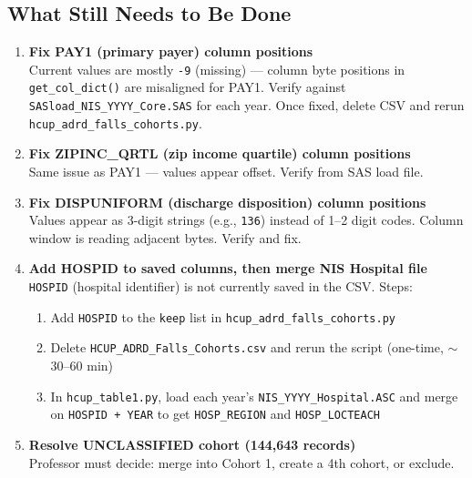 \documentclass[11pt,letterpaper]{article}
\begin{document}
\subsection{What Still Needs to Be Done}

\begin{tcolorbox}[colback=warnred!8, colframe=warnred,
  title=\textbf{Pending Tasks — Project 2}]
\begin{enumerate}[itemsep=6pt]
  \item \textbf{Fix PAY1 (primary payer) column positions} \\
        Current values are mostly \texttt{-9} (missing) — column byte positions in
        \texttt{get\_col\_dict()} are misaligned for PAY1. Verify against
        \texttt{SASload\_NIS\_YYYY\_Core.SAS} for each year. Once fixed, delete CSV
        and rerun \texttt{hcup\_adrd\_falls\_cohorts.py}.

  \item \textbf{Fix ZIPINC\_QRTL (zip income quartile) column positions} \\
        Same issue as PAY1 — values appear offset. Verify from SAS load file.

  \item \textbf{Fix DISPUNIFORM (discharge disposition) column positions} \\
        Values appear as 3-digit strings (e.g., \texttt{136}) instead of 1–2 digit
        codes. Column window is reading adjacent bytes. Verify and fix.

  \item \textbf{Add HOSPID to saved columns, then merge NIS Hospital file} \\
        \texttt{HOSPID} (hospital identifier) is not currently saved in the CSV.
        Steps:
        \begin{enumerate}
          \item Add \texttt{HOSPID} to the \texttt{keep} list in
                \texttt{hcup\_adrd\_falls\_cohorts.py}
          \item Delete \texttt{HCUP\_ADRD\_Falls\_Cohorts.csv} and rerun the script
                (one-time, $\sim$30–60 min)
          \item In \texttt{hcup\_table1.py}, load each year's
                \texttt{NIS\_YYYY\_Hospital.ASC} and merge on \texttt{HOSPID + YEAR}
                to get \texttt{HOSP\_REGION} and \texttt{HOSP\_LOCTEACH}
        \end{enumerate}

  \item \textbf{Resolve UNCLASSIFIED cohort (144,643 records)} \\
        Professor must decide: merge into Cohort 1, create a 4th cohort, or exclude.


\end{enumerate}
\end{tcolorbox}
\end{document}
